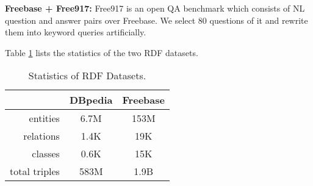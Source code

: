 
\noindent\textbf{Freebase + Free917:}
Free917 \cite{cai2013large} is an open QA benchmark which consists of NL question and answer pairs over Freebase. We select 80 questions of it and rewrite them into keyword queries artificially. 

Table \ref{tab:statistic_rdf_graph} lists the statistics of the two RDF datasets.
\begin{table} [h]
\begin{tabular}
{  r | c | c }
\hline
 & DBpedia & Freebase \\ 
\hline
entities & 6.7M & 153M \\
relations & 1.4K & 19K\\
classes & 0.6K  & 15K\\
total triples & 583M & 1.9B \\
\hline
\end{tabular}
\caption{Statistics of RDF Datasets.}
\label{tab:statistic_rdf_graph}
\vspace{-0.3in}
\end{table}


